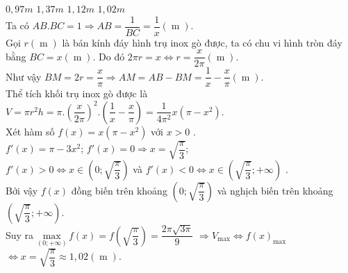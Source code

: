\begin{ex}
\begin{center}
	\end{center}
	\choice
	{$0{,}97m$}
	{$1{,}37m$}
	{$1{,}12m$}
	{\True $1{,}02m$}
	\loigiai
	{\True\\
		Ta có $AB.BC=1\Rightarrow AB=\dfrac{1}{BC}=\dfrac{1}{x}\left(\operatorname{m}\right)$.\\
		Gọi $r\left(\operatorname{m}\right)$ là bán kính đáy hình trụ inox gò được, ta có chu vi hình tròn đáy bằng $BC=x\left(\operatorname{m}\right).$ Do đó $2\pi r=x\Leftrightarrow r=\dfrac{x}{2\pi}\left(\operatorname{m}\right)$.\\
		Như vậy $BM=2r=\dfrac{x}{\pi}\Rightarrow AM=AB-BM=\dfrac{1}{x}-\dfrac{x}{\pi}\left(\operatorname{m}\right)$.\\
		Thể tích khối trụ inox gò được là $V=\pi{r^2}h=\pi .\left(\dfrac{x}{2\pi}\right)^2.\left(\dfrac{1}{x}-\dfrac{x}{\pi}\right)=\dfrac{1}{4\pi^2}x\left(\pi-x^2\right)$.\\
		Xét hàm số $f(x)=x\left(\pi-x^2\right)$ với $x>0$ .\\
		$f'(x)=\pi-3x^2$; $f'(x)=0\Rightarrow x=\sqrt{\dfrac{\pi}{3}}$;\\
		$f'(x)>0\Leftrightarrow x\in\left(0;\sqrt{\dfrac{\pi}{3}}\right)$ và $f'(x)<0\Leftrightarrow x\in\left(\sqrt{\dfrac{\pi}{3}};+\infty\right)$ .\\
		Bởi vậy $f(x)$ đồng biến trên khoảng $\left(0;\sqrt{\dfrac{\pi}{3}}\right)$ và nghịch biến trên khoảng $\left(\sqrt{\dfrac{\pi}{3}};+\infty\right)$.\\
		Suy ra $\underset{\left(0;+\infty\right)}{\text{max}}\,f(x)=f\left(\sqrt{\dfrac{\pi}{3}}\right)=\dfrac{2\pi\sqrt{3\pi}}{9}$ $\Rightarrow{V_{\text{max}}}\Leftrightarrow f{(x)_{\text{max}}}$ $\Leftrightarrow x=\sqrt{\dfrac{\pi}{3}}\approx 1,02\left(\operatorname{m}\right)$.}
\end{ex}

